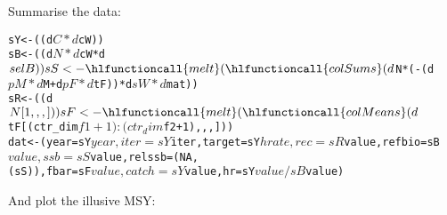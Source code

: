 \documentclass[a4paper]{article}
\begin{document}
Summarise the data:
\begin{knitrout}
\color{fgcolor}\begin{kframe}
\begin{alltt}
sY <- ((d$C * d$cW))
sB <- ((d$N * d$cW * d$selB))
sS <- \hlfunctioncall{melt}(\hlfunctioncall{colSums}(d$N * (-(d$pM * d$M + d$pF * d$tF)) * d$sW * d$mat))
sR <- ((d$N[1, , , ]))
sF <- \hlfunctioncall{melt}(\hlfunctioncall{colMeans}(d$tF[(ctr_dim$f1 + 1):(ctr_dim$f2 + 1), , , ]))
dat <- (year = sY$year, iter = sY$iter, target = sY$hrate, 
    rec = sR$value, refbio = sB$value, ssb = sS$value, relssb = (NA, 
        (sS)), fbar = sF$value, catch = sY$value, hr = sY$value/sB$value)
\end{alltt}
\end{kframe}
\end{knitrout}

And plot the illusive MSY:
\end{document}
